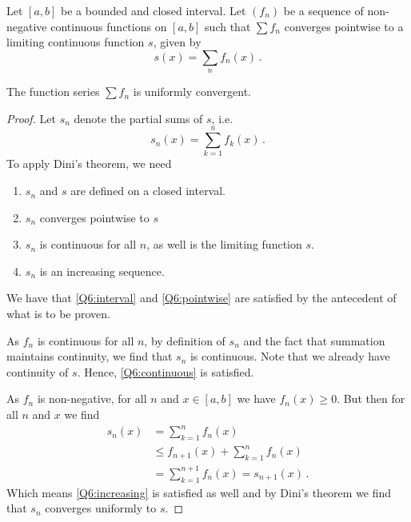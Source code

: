 \documentclass[week=6]{homework}
\begin{document}
\begin{questions}
	    
	    \question
	    Let $[a,b]$ be a bounded and closed interval. Let $(f_n)$ be a sequence of non-negative continuous functions on $[a,b]$ such that $\sum f_n$ converges pointwise to a limiting continuous function $s$, given by
	    \[
		    s(x) = \sum_n f_n(x)\,.
	    \]
	    \begin{toprove}
	    	The function series $\sum f_n$ is uniformly convergent.
	    \end{toprove}
	    \begin{proof}
	    	Let $s_n$ denote the partial sums of $s$, i.e.
	    	\[
	    	s_n(x) = \sum_{k=1}^{n} f_k(x)\,.
	    	\]
	    	To apply Dini's theorem, we need
	    	\begin{enumerate}
	    		\item \label{Q6:interval} $s_n$ and $s$ are defined on a closed interval.
	    		\item \label{Q6:pointwise} $s_n$ converges pointwise to $s$
	    		\item \label{Q6:continuous} $s_n$ is continuous for all $n$, as well is the limiting function $s$.
	    		\item \label{Q6:increasing} $s_n$ is an increasing sequence.
	    	\end{enumerate}
	    	We have that \ref{Q6:interval} and \ref{Q6:pointwise} are satisfied by the antecedent of what is to be proven.
	    	
	    	As $f_n$ is continuous for all $n$, by definition of $s_n$ and the fact that summation maintains continuity, we find that $s_n$ is continuous. Note that we already have continuity of $s$. Hence, \ref{Q6:continuous} is satisfied.
	    	
	    	As $f_n$ is non-negative, for all $n$ and $x \in [a,b]$ we have $f_n(x) \geq 0$. But then for all $n$ and $x$ we find
	    	\begin{align*}
	    	s_n(x) &= \sum_{k=1}^{n} f_n(x) \\
	    	&\leq f_{n+1}(x) + \sum_{k=1}^{n} f_n(x) \\
	    	&= \sum_{k=1}^{n+1} f_n(x) = s_{n+1}(x)\,.
	    	\end{align*}
	    	Which means \ref{Q6:increasing} is satisfied as well and by Dini's theorem we find that $s_n$ converges uniformly to $s$.
	    \end{proof}
     \end{questions}
\end{document}
